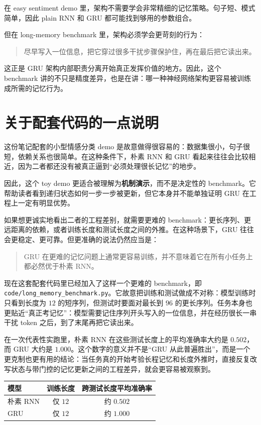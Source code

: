 \documentclass[12pt,a4paper]{ctexart}
\begin{document}
在 easy sentiment demo 里，架构不需要学会非常精细的记忆策略。句子短、模式简单，因此 plain RNN 和 GRU 都可能找到够用的参数组合。

但在 long-memory benchmark 里，架构必须学会更苛刻的行为：
\begin{quote}
尽早写入一位信息，把它穿过很多干扰步骤保护住，再在最后把它读出来。
\end{quote}

这正是 GRU 架构内部职责分离开始真正发挥价值的地方。因此，这个 benchmark 讲的不只是精度差异，也是在讲：哪一种神经网络架构更容易被训练成所需的记忆行为。

\section{关于配套代码的一点说明}

这份笔记配套的小型情感分类 demo 是故意做得很容易的：数据集很小，句子很短，依赖关系也很简单。在这种条件下，朴素 RNN 和 GRU 看起来往往会比较相近，因为二者都还没有被真正逼到“必须处理很长记忆”的地步。

因此，这个 toy demo 更适合被理解为\textbf{机制演示}，而不是决定性的 benchmark。它帮助读者看到递归状态如何一步一步被更新，但它本身并不能单独证明 GRU 在工程上一定有明显优势。

如果想更诚实地看出二者的工程差别，就需要更难的 benchmark：更长序列、更远距离的依赖，或者训练长度和测试长度之间的外推。在这种场景下，GRU 往往会更稳定、更可靠。但更准确的说法仍然应当是：
\begin{quote}
GRU 在更难的记忆问题上通常更容易训练，并不意味着它在所有小任务上都必然优于朴素 RNN。
\end{quote}

现在这套配套代码里已经加入了这样一个更难的 benchmark，即
\texttt{code/long\_memory\_benchmark.py}。它故意把训练和测试做成不对称：模型训练时只看到长度为 \(12\) 的短序列，但测试时要面对最长到 \(96\) 的更长序列。任务本身也更贴近“真正考记忆”：模型需要记住序列开头写入的一位信息，并在经历很长一串干扰 token 之后，到了末尾再把它读出来。

在一次代表性实跑里，朴素 RNN 在这些测试长度上的平均准确率大约是 \(0.502\)，而 GRU 大约是 \(1.000\)。这个数字的意义并不是“GRU 从此普遍胜出”，而是一个更克制也更有用的结论：当任务真的开始考验长程记忆和长度外推时，直接反复改写状态与带门控的记忆更新之间的工程差异，就会更容易被观察到。

\begin{center}
\begin{tabular}{lcc}
\toprule
模型 & 训练长度 & 跨测试长度平均准确率 \\
\midrule
朴素 RNN & 仅 \(12\) & 约 \(0.502\) \\
GRU & 仅 \(12\) & 约 \(1.000\) \\
\bottomrule
\end{tabular}
\end{center}
\end{document}
